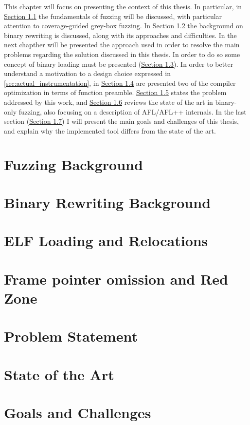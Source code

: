 This chapter will focus on presenting the context of this thesis.
In particular, in \hyperref[sec:fuzz_background]{Section 1.1} the fundamentals of fuzzing will be discussed, with particular attention to coverage-guided grey-box fuzzing.
In \hyperref[sec:biniary_rewriting]{Section 1.2} the background on binary rewriting is discussed, along with its approaches and difficulties.
In the next chapther will be presented the approach used in order to resolve the main problems regarding the solution 
discussed in this thesis. In order to do so some concept of binary loading must be presented (\hyperref[sec:loading_relocations]{Section 1.3}).
In order to better understand a motivation to a design choice expressed in \cref{sec:actual_instrumentation}, in 
\hyperref[sec:preamble]{Section 1.4} are presented two of the compiler optimization in terms of function preamble.
\hyperref[sec:problem_statement]{Section 1.5} states the problem addressed by this work,
and \hyperref[sec:state_of_the_art]{Section 1.6} reviews the state of the art in binary-only fuzzing, also focusing on a description
of AFL/AFL++ internals. In the last section (\hyperref[sec:goals-and-challenges]{Section 1.7}) I will present the main
goals and challenges of this thesis, and explain why the implemented tool differs from the state of the art.

\section{Fuzzing Background} \label{sec:fuzz_background}
    
\section{Binary Rewriting Background}\label{sec:biniary_rewriting}
    
\section{ELF Loading and Relocations}\label{sec:loading_relocations}
    
\section{Frame pointer omission and Red Zone}\label{sec:preamble}
    
\section{Problem Statement}\label{sec:problem_statement}
    
\section{State of the Art}\label{sec:state_of_the_art}
    
\section{Goals and Challenges}\label{sec:goals-and-challenges}
    